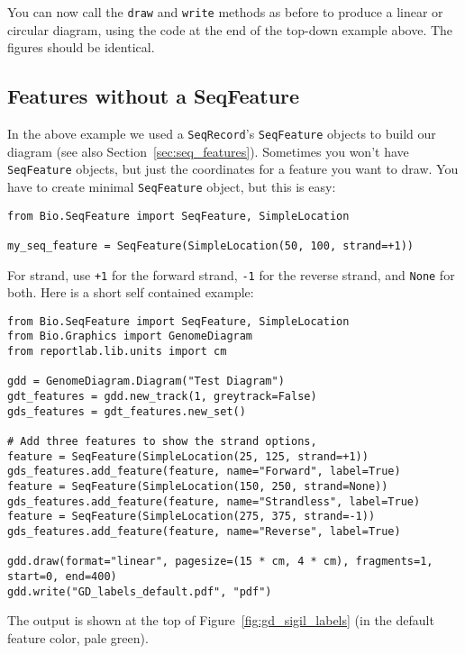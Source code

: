 You can now call the \verb|draw| and \verb|write| methods as before to produce
a linear or circular diagram, using the code at the end of the top-down example
above.  The figures should be identical.

\subsection{Features without a SeqFeature}
\label{sec:gd_features_without_seqfeatures}

In the above example we used a \verb|SeqRecord|'s \verb|SeqFeature| objects
to build our diagram (see also Section~\ref{sec:seq_features}).
Sometimes you won't have \verb|SeqFeature| objects,
but just the coordinates for a feature you want to draw.  You have to create
minimal \verb|SeqFeature| object, but this is easy:

\begin{verbatim}
from Bio.SeqFeature import SeqFeature, SimpleLocation

my_seq_feature = SeqFeature(SimpleLocation(50, 100, strand=+1))
\end{verbatim}

For strand, use \texttt{+1} for the forward strand, \texttt{-1} for the
reverse strand, and \texttt{None} for both.  Here is a short self contained
example:

\begin{verbatim}
from Bio.SeqFeature import SeqFeature, SimpleLocation
from Bio.Graphics import GenomeDiagram
from reportlab.lib.units import cm

gdd = GenomeDiagram.Diagram("Test Diagram")
gdt_features = gdd.new_track(1, greytrack=False)
gds_features = gdt_features.new_set()

# Add three features to show the strand options,
feature = SeqFeature(SimpleLocation(25, 125, strand=+1))
gds_features.add_feature(feature, name="Forward", label=True)
feature = SeqFeature(SimpleLocation(150, 250, strand=None))
gds_features.add_feature(feature, name="Strandless", label=True)
feature = SeqFeature(SimpleLocation(275, 375, strand=-1))
gds_features.add_feature(feature, name="Reverse", label=True)

gdd.draw(format="linear", pagesize=(15 * cm, 4 * cm), fragments=1, start=0, end=400)
gdd.write("GD_labels_default.pdf", "pdf")
\end{verbatim}

The output is shown at the top of Figure~\ref{fig:gd_sigil_labels}
(in the default feature color, pale green).

